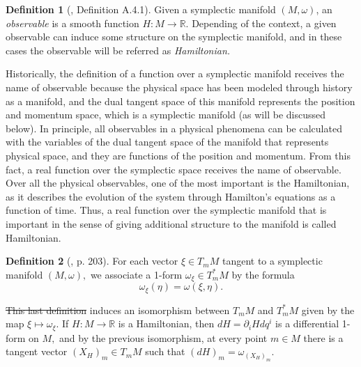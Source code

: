 \documentclass[12pt, letterpaper, reqno]{amsart}
\theoremstyle{definition}
\newtheorem{df}{Definition}
\theoremstyle{plain}
\theoremstyle{remark}
\providecommand{\DIFadd}[1]{{\protect\color{blue}\uwave{#1}}} %
\providecommand{\DIFdel}[1]{{\protect\color{red}\sout{#1}}}                      %
\providecommand{\DIFaddbegin}{} %
\providecommand{\DIFaddend}{} %
\providecommand{\DIFdelbegin}{} %
\providecommand{\DIFdelend}{} %
\newcommand{\DIFscaledelfig}{0.5}
\newlength{\DIFdelgraphicswidth} %
\newlength{\DIFdelgraphicsheight} %
\newcommand{\DIFaddincludegraphics}[2][]{{\color{blue}\fbox{\DIFOincludegraphics[#1]{#2}}}} %
\newcommand{\DIFdelincludegraphics}[2][]{%
\sbox{\DIFdelgraphicsbox}{\DIFOincludegraphics[#1]{#2}}%
\settoboxwidth{\DIFdelgraphicswidth}{\DIFdelgraphicsbox} %
\settoboxtotalheight{\DIFdelgraphicsheight}{\DIFdelgraphicsbox} %
\scalebox{\DIFscaledelfig}{%
\parbox[b]{\DIFdelgraphicswidth}{\usebox{\DIFdelgraphicsbox}\\[-\baselineskip] \rule{\DIFdelgraphicswidth}{0em}}\llap{\resizebox{\DIFdelgraphicswidth}{\DIFdelgraphicsheight}{%
\setlength{\unitlength}{\DIFdelgraphicswidth}%
\begin{picture}(1,1)%
\thicklines\linethickness{2pt} %
{\color[rgb]{1,0,0}\put(0,0){\framebox(1,1){}}}%
{\color[rgb]{1,0,0}\put(0,0){\line( 1,1){1}}}%
{\color[rgb]{1,0,0}\put(0,1){\line(1,-1){1}}}%
\end{picture}%
}\hspace*{3pt}}} %
} %
\DeclareRobustCommand{\DIFaddbegin}{\DIFOaddbegin \let\includegraphics\DIFaddincludegraphics} %
\DeclareRobustCommand{\DIFaddend}{\DIFOaddend \let\includegraphics\DIFOincludegraphics} %
\DeclareRobustCommand{\DIFdelbegin}{\DIFOdelbegin \let\includegraphics\DIFdelincludegraphics} %
\DeclareRobustCommand{\DIFdelend}{\DIFOaddend \let\includegraphics\DIFOincludegraphics} %
\begin{document}
\DIFdelbegin %
\DIFdelend \DIFaddbegin \begin{df}[\cite{montgomery2002tour}, Definition A.4.1]
	\DIFaddend Given a symplectic manifold  $ (M,\omega) $, an \textit{observable} is a smooth function $ H: M \rightarrow \mathbb{R}. $ Depending of the context, a given observable can induce some structure on the symplectic manifold, and in these cases the observable will be referred \DIFaddbegin \DIFadd{to }\DIFaddend as \DIFaddbegin \DIFadd{a }\DIFaddend \textit{Hamiltonian.} 
\end{df}

Historically, the definition of a function over a symplectic manifold receives the name of observable because the physical space has been modeled through history as a manifold, and the dual tangent space of this manifold represents the position and momentum space, which is a symplectic manifold (as will be discussed below). In principle, all observables in a physical phenomena can be calculated with the variables of the dual tangent space of the manifold that represents physical space, and they are functions of the position and momentum. From this fact, a real function over the symplectic space receives the name of observable. Over all the physical observables, one of the most important is the Hamiltonian, as it describes the evolution of the system through Hamilton's equations as a function of time. Thus, a real function over the symplectic manifold that is important in the sense of giving additional structure to the manifold is called Hamiltonian.

\DIFdelbegin %
\DIFdelend \DIFaddbegin \begin{df}[\cite{arnol2013mathematical}, p. 203] \label{df:symplectic_form}
	\DIFaddend For each vector $ \xi\in T_mM  $ tangent to a symplectic manifold $ (M,\omega), $ we associate a 1-form $ \omega_\xi\in T^*_mM $ by the formula $$ \omega_\xi(\eta)=\omega(\xi,\eta). $$  
\end{df}

\DIFdelbegin \DIFdel{This last definition }\DIFdelend \DIFaddbegin \DIFadd{Definition \ref{df:symplectic_form} }\DIFaddend induces an isomorphism between $ T_mM $ and $ T^*_mM $ given by the map $ \xi \mapsto \omega_\xi. $ If $ H: M \rightarrow \mathbb{R} $ is a Hamiltonian, then $ dH = \partial_i H dq^i $ is a differential 1-form on $ M, $ and by the previous isomorphism, at every point $ m\in M $ there is a tangent vector $ (X_H)_m \in T_mM $ such that $ (dH)_m = \omega_{(X_H)_m}. $ 
\end{document}
